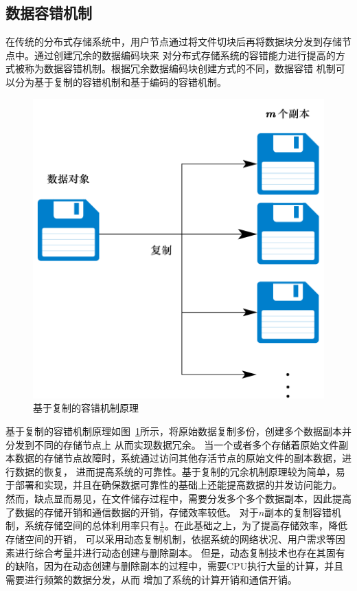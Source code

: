 \subsection{数据容错机制}
在传统的分布式存储系统中，用户节点通过将文件切块后再将数据块分发到存储节点中。通过创建冗余的数据编码块来
对分布式存储系统的容错能力进行提高的方式被称为数据容错机制。根据冗余数据编码块创建方式的不同，数据容错
机制可以分为基于复制的容错机制和基于编码的容错机制。
\begin{figure}[tb]
	\centering
	\includegraphics [scale=0.5]{figures/1.1.pdf}
	\caption{基于复制的容错机制原理}
	\label{fig:con-1.1}
\end{figure}

基于复制的容错机制原理如图~\ref{fig:con-1.1}所示，将原始数据复制多份，创建多个数据副本并分发到不同的存储节点上
从而实现数据冗余\cite{shvachko2010hadoop,ghemawat2003google,王意洁2017分布式存储中的纠删码容错技术研究}。
当一个或者多个存储着原始文件副本数据的存储节点故障时，系统通过访问其他存活节点的原始文件的副本数据，进行数据的恢复，
进而提高系统的可靠性。基于复制的冗余机制原理较为简单，易于部署和实现，并且在确保数据可靠性的基础上还能提高数据的并发访问能力。
然而，缺点显而易见，在文件储存过程中，需要分发多个多个数据副本，因此提高了数据的存储开销和通信数据的开销，存储效率较低。
对于$n$副本的复制容错机制，系统存储空间的总体利用率只有$\frac{1}{n}$。在此基础之上，为了提高存储效率，降低存储空间的开销，
可以采用动态复制机制，依据系统的网络状况、用户需求等因素进行综合考量并进行动态创建与删除副本\cite{lakshman2010cassandra,gill2016dynamic,gai2012design}。
但是，动态复制技术也存在其固有的缺陷，因为在动态创建与删除副本的过程中，需要CPU执行大量的计算，并且需要进行频繁的数据分发，从而
增加了系统的计算开销和通信开销。


